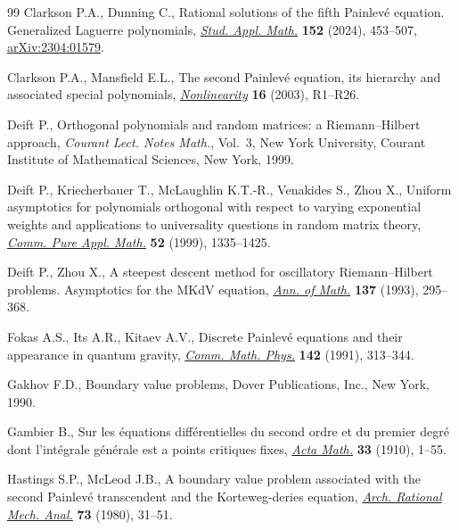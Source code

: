 \documentclass[10pt,a4paper]{amsart}
\numberwithin{equation}{section}
\theoremstyle{definition}
\begin{document}
\begin{thebibliography}{99}
Clarkson P.A., Dunning C., Rational solutions of the fifth {P}ainlev\'e
 equation. {G}eneralized {L}aguerre polynomials,
 \href{https://doi.org/10.1111/sapm.12649}{\textit{Stud. Appl. Math.}}
 \textbf{152} (2024), 453--507,
 \href{http://arxiv.org/abs/2304:01579}{arXiv:2304:01579}.

Clarkson P.A., Mansfield E.L., The second {P}ainlev\'e equation, its hierarchy
 and associated special polynomials,
 \href{https://doi.org/10.1088/0951-7715/16/3/201}{\textit{Nonlinearity}}
 \textbf{16} (2003), R1--R26.

Deift P., Orthogonal polynomials and random matrices: a {R}iemann--{H}ilbert
 approach, \textit{Courant Lect. Notes Math.}, Vol.~3, New York University,
 Courant Institute of Mathematical Sciences, New York, 1999.

Deift P., Kriecherbauer T., McLaughlin K.T.-R., Venakides S., Zhou X., Uniform
 asymptotics for polynomials orthogonal with respect to varying exponential
 weights and applications to universality questions in random matrix theory,
 \href{https://doi.org/10.1002/(SICI)1097-0312(199911)52:11<1335::AID-CPA1>3.0.CO;2-1}{\textit{Comm.
 Pure Appl. Math.}} \textbf{52} (1999), 1335--1425.

Deift P., Zhou X., A steepest descent method for oscillatory
 {R}iemann--{H}ilbert problems. {A}symptotics for the {MK}d{V} equation,
 \href{https://doi.org/10.2307/2946540}{\textit{Ann. of Math.}} \textbf{137}
 (1993), 295--368.

Fokas A.S., Its A.R., Kitaev A.V., Discrete {P}ainlev\'e equations and their
 appearance in quantum gravity,
 \href{https://doi.org/10.1007/BF02102066}{\textit{Comm. Math. Phys.}}
 \textbf{142} (1991), 313--344.

Gakhov F.D., Boundary value problems, Dover Publications, Inc., New York, 1990.

Gambier B., Sur les \'equations diff\'erentielles du second ordre et du premier
 degr\'e dont l'int\'egrale g\'en\'erale est a points critiques fixes,
 \href{https://doi.org/10.1007/BF02393211}{\textit{Acta Math.}} \textbf{33}
 (1910), 1--55.

Hastings S.P., McLeod J.B., A boundary value problem associated with the second
 {P}ainlev\'e transcendent and the {K}orteweg-deries equation,
 \href{https://doi.org/10.1007/BF00283254}{\textit{Arch. Rational Mech.
 Anal.}} \textbf{73} (1980), 31--51.


\end{thebibliography}
\end{document}
